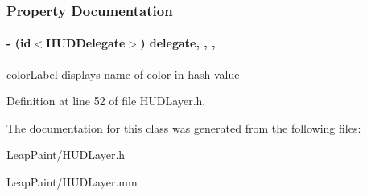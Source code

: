 \subsubsection{Property Documentation}
\hypertarget{interface_h_u_d_layer_a64cb26c1f8c5a76e8f392a02291c0cf6}{
\paragraph[{delegate}]{\setlength{\rightskip}{0pt plus 5cm}-\/ (id$<${\bf H\-U\-D\-Delegate}$>$) delegate\hspace{0.3cm}{\ttfamily [read]}, {\ttfamily [write]}, {\ttfamily [nonatomic]}, {\ttfamily [weak]}}}\label{d3/d8a/interface_h_u_d_layer_a64cb26c1f8c5a76e8f392a02291c0cf6}
color\-Label displays name of color in hash value 

Definition at line 52 of file H\-U\-D\-Layer.\-h.



The documentation for this class was generated from the following files\-:\begin{DoxyCompactItemize}
\item 
Leap\-Paint/H\-U\-D\-Layer.\-h\item 
Leap\-Paint/H\-U\-D\-Layer.\-mm\end{DoxyCompactItemize}
